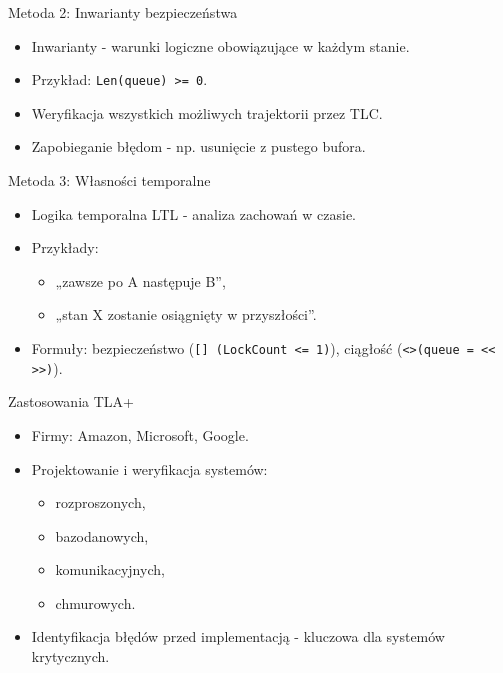 \documentclass{beamer}
\begin{document}
\begin{frame}{Metoda 2: Inwarianty bezpieczeństwa}
  \begin{itemize}
      \item Inwarianty - warunki logiczne obowiązujące w każdym stanie.
      \item Przykład: \texttt{Len(queue) >= 0}.
      \item Weryfikacja wszystkich możliwych trajektorii przez TLC.
      \item Zapobieganie błędom - np. usunięcie z pustego bufora.
  \end{itemize}
\end{frame}

\begin{frame}{Metoda 3: Własności temporalne}
  \begin{itemize}
      \item Logika temporalna LTL - analiza zachowań w czasie.
      \item Przykłady:
      \begin{itemize}
          \item „zawsze po A następuje B”,
          \item „stan X zostanie osiągnięty w przyszłości”.
      \end{itemize}
      \item Formuły: bezpieczeństwo (\texttt{[] (LockCount <= 1)}), ciągłość (\texttt{<>(queue = << >>)}).
  \end{itemize}
\end{frame}

\begin{frame}{Zastosowania TLA+}
  \begin{itemize}
      \item Firmy: Amazon, Microsoft, Google.
      \item Projektowanie i weryfikacja systemów:
      \begin{itemize}
          \item rozproszonych,
          \item bazodanowych,
          \item komunikacyjnych,
          \item chmurowych.
      \end{itemize}
      \item Identyfikacja błędów przed implementacją - kluczowa dla systemów krytycznych.
  \end{itemize}
\end{frame}
\end{document}
